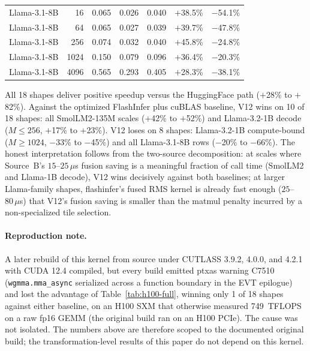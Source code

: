 \documentclass{article}
\begin{document}
\begin{table}[h!]
\begin{tabular}{l r r r r r r}
Llama-3.1-8B & 16   & 0.065 & 0.026 & 0.040 & $+$38.5\% & $-$54.1\% \\
Llama-3.1-8B & 64   & 0.065 & 0.027 & 0.039 & $+$39.7\% & $-$47.8\% \\
Llama-3.1-8B & 256  & 0.074 & 0.032 & 0.040 & $+$45.8\% & $-$24.8\% \\
Llama-3.1-8B & 1024 & 0.150 & 0.079 & 0.096 & $+$36.4\% & $-$20.3\% \\
Llama-3.1-8B & 4096 & 0.565 & 0.293 & 0.405 & $+$28.3\% & $-$38.1\% \\
\hline
\end{tabular}
\end{table}

All 18 shapes deliver positive speedup versus the HuggingFace path ($+$28\% to $+$82\%). Against the optimized FlashInfer plus cuBLAS baseline, V12 wins on 10 of 18 shapes: all SmolLM2-135M scales ($+$42\% to $+$52\%) and Llama-3.2-1B decode ($M \leq 256$, $+$17\% to $+$23\%). V12 loses on 8 shapes: Llama-3.2-1B compute-bound ($M \geq 1024$, $-$33\% to $-$45\%) and all Llama-3.1-8B rows ($-$20\% to $-$66\%). The honest interpretation follows from the two-source decomposition: at scales where Source~B's $15$--$25\,\mu$s fusion saving is a meaningful fraction of call time (SmolLM2 and Llama-1B decode), V12 wins decisively against both baselines; at larger Llama-family shapes, flashinfer's fused RMS kernel is already fast enough ($25$--$80\,\mu$s) that V12's fusion saving is smaller than the matmul penalty incurred by a non-specialized tile selection.

\paragraph{Reproduction note.} A later rebuild of this kernel from source under CUTLASS 3.9.2, 4.0.0, and 4.2.1 with CUDA 12.4 compiled, but every build emitted ptxas warning C7510 (\texttt{wgmma.mma\_async} serialized across a function boundary in the EVT epilogue) and lost the advantage of Table~\ref{tab:h100-full}, winning only 1 of 18 shapes against either baseline, on an H100 SXM that otherwise measured 749~TFLOPS on a raw fp16 GEMM (the original build ran on an H100 PCIe). The cause was not isolated. The numbers above are therefore scoped to the documented original build; the transformation-level results of this paper do not depend on this kernel.
\end{document}
